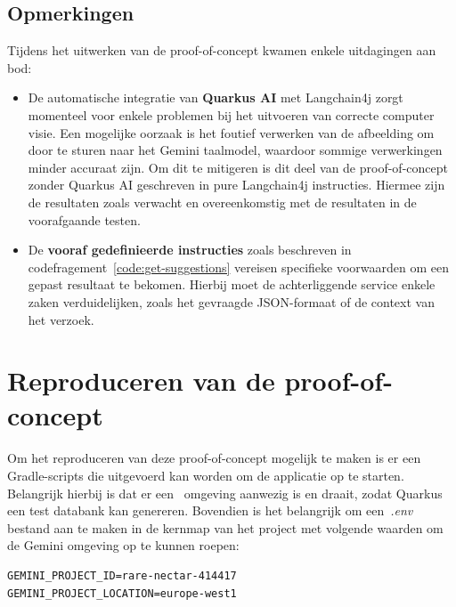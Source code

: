 \subsection{Opmerkingen}
\label{subsec:opmerkingen}
Tijdens het uitwerken van de proof-of-concept kwamen enkele uitdagingen aan bod:
\begin{itemize}
    \item De automatische integratie van \textbf{Quarkus AI} met Langchain4j zorgt momenteel voor enkele problemen bij het uitvoeren van correcte computer visie.
    Een mogelijke oorzaak is het foutief verwerken van de afbeelding om door te sturen naar het Gemini taalmodel, waardoor sommige verwerkingen minder accuraat zijn.
    Om dit te mitigeren is dit deel van de proof-of-concept zonder Quarkus AI geschreven in pure Langchain4j instructies.
    Hiermee zijn de resultaten zoals verwacht en overeenkomstig met de resultaten in de voorafgaande testen.
    \item De \textbf{vooraf gedefinieerde instructies} zoals beschreven in codefragement~\ref{code:get-suggestions} vereisen specifieke voorwaarden om een gepast resultaat te bekomen.
    Hierbij moet de achterliggende service enkele zaken verduidelijken, zoals het gevraagde JSON-formaat of de context van het verzoek.
\end{itemize}

\section{Reproduceren van de proof-of-concept}
\label{sec:reproduceren-van-de-proof-of-concept}
Om het reproduceren van deze proof-of-concept mogelijk te maken is er een Gradle-scripts die uitgevoerd kan worden om de applicatie op te starten.
Belangrijk hierbij is dat er een~ omgeving aanwezig is en draait, zodat Quarkus een test databank kan genereren.
Bovendien is het belangrijk om een~\textit{.env} bestand aan te maken in de kernmap van het project met volgende waarden om de Gemini omgeving op te kunnen roepen:
\begin{listing}[H]
    \begin{verbatim}
GEMINI_PROJECT_ID=rare-nectar-414417
GEMINI_PROJECT_LOCATION=europe-west1
    \end{verbatim}
\end{listing}

